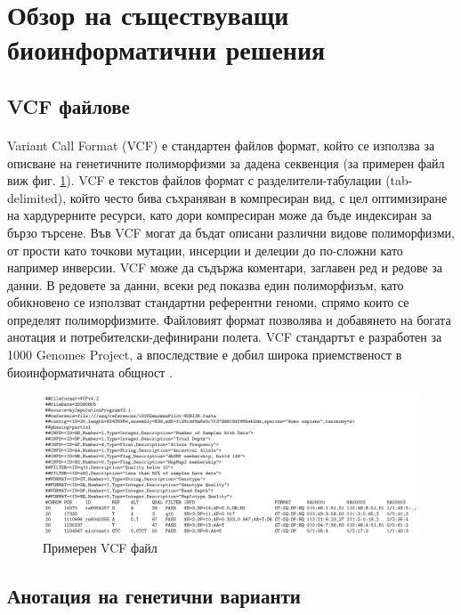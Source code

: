 \documentclass[pdftex,cyrillic,14pt,a4page,twoside,openright]{extreport}
\begin{document}
\section[Обзор на съществуващи биоинформатични решения]{Обзор на съществуващи\\ биоинформатични решения}
\subsection{VCF файлове}
\paragraph{}
Variant Call Format (VCF) е стандартен файлов формат, който се използва за описване на генетичните полиморфизми за дадена секвенция (за примерен файл виж фиг. \ref{fig:example_vcf}). VCF е текстов файлов формат с разделители-табулации (tab-delimited), който често бива съхраняван в компресиран вид, с цел оптимизиране на хардурерните ресурси, като дори компресиран може да бъде индексиран за бързо търсене. Във VCF могат да бъдат описани различни видове полиморфизми, от прости като точкови мутации, инсерции и делеции до по-сложни като например инверсии. VCF може да съдържа коментари, заглавен ред и редове за данни. В редовете за данни, всеки ред показва един полиморфизъм, като обикновено се използват стандартни референтни геноми, спрямо които се определят полиморфизмите. Файловият формат позволява и добавянето на богата анотация и потребителски-дефинирани полета. VCF стандартът е разработен за 1000 Genomes Project, а впоследствие е добил широка приемственост в биоинформатичната общност \cite{danecek2011}.

\begin{figure}[h]
  \centering
  \includegraphics[width=17cm]{figures/vcf}
  \caption {Примерен VCF файл}
  \label{fig:example_vcf}
\end{figure}


\subsection{Анотация на генетични варианти}
\end{document}
